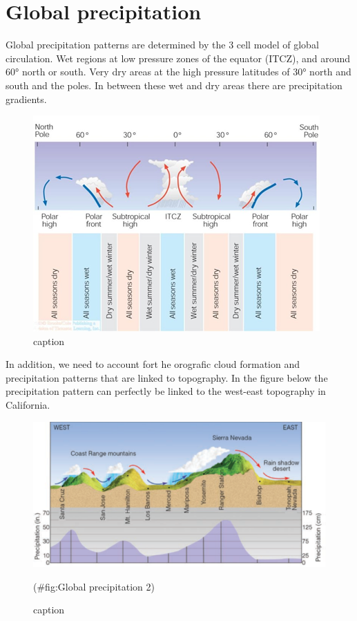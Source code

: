 \documentclass[12pt,oneside]{book}
\begin{document}
\section{Global precipitation}\label{global-precipitation}

Global precipitation patterns are determined by the 3 cell model of
global circulation. Wet regions at low pressure zones of the equator
(ITCZ), and around 60° north or south. Very dry areas at the high
pressure latitudes of 30° north and south and the poles. In between
these wet and dry areas there are precipitation gradients.

\begin{figure}

{\centering \includegraphics[width=0.8\linewidth]{figures/Figure82} 

}

\caption{caption}\label{fig:Globalprecipitation}
\end{figure}

In addition, we need to account fort he orografic cloud formation and
precipitation patterns that are linked to topography. In the figure
below the precipitation pattern can perfectly be linked to the west-east
topography in California.

\begin{figure}

{\centering \includegraphics[width=0.8\linewidth]{figures/Figure83} 

}

\caption{caption}(\#fig:Global precipitation 2)
\end{figure}
\end{document}
